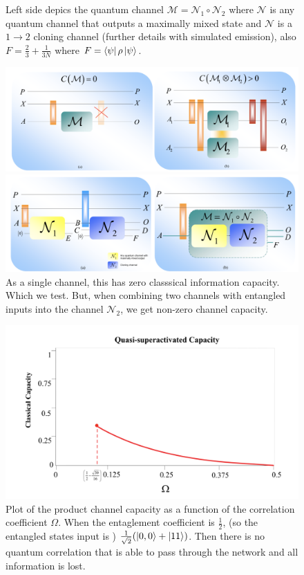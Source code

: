\documentclass[11pt]{extarticle}	 %
\begin{document}
\begin{flushleft}
\begin{enumerate}
\begin{enumerate}[label=(\Alph*)]
\begin{figure}[h]
\centering
\caption{Left side depics the quantum channel $\mathcal{M} = \mathcal{N}_1 \circ \mathcal{N}_2$ where $\mathcal{N}$ is any quantum channel that outputs a maximally mixed state and $\mathcal{N}$ is a $1 \to 2 $ cloning channel (further details with simulated emission), also $F = \frac{2}{3} + \frac{1}{3N}$ where $F = \bra{\psi} \rho \ket{\psi}$.}
\includegraphics[width=400pt]{first.png}
\caption{As a single channel, this has zero classsical information capacity. Which we test. But, when combining two channels with entangled inputs into the channel $\mathcal{N}_2$, we get non-zero channel capacity.}
\includegraphics[width=400pt]{second.png}
  \end{figure}
\begin{figure}[h]
  \centering
\caption{Plot of the product channel capacity as a function of the correlation coefficient $\Omega$. When the entaglement coefficient is $\frac{1}{2}$, (so the entangled states input is ) $ \frac{1}{\sqrt{2}} (\ket{0,0} + \ket{11})$. Then there is no quantum correlation that is able to pass through the network and all information is lost. }
\includegraphics[width=400pt]{correlation.png}

\end{figure}
\end{enumerate}
\end{enumerate}
\end{flushleft}
\end{document}
